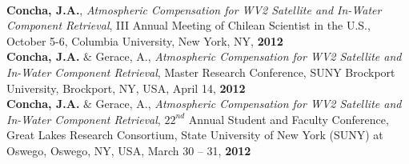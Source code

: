 \documentclass[11pt]{res}
\begin{document}
\begin{resume}
\vspace{0.1in}\\
{\bf Concha, J.A.}, {\it Atmospheric Compensation for WV2 Satellite and In-Water Component Retrieval}, III Annual Meeting of Chilean Scientist in the U.S., October 5-6, Columbia University, New York, NY, {\bf 2012}
\vspace{0.1in}\\
{\bf Concha, J.A.} $\&$ Gerace, A., {\it Atmospheric Compensation for WV2 Satellite and In-Water Component Retrieval}, Master Research Conference, SUNY Brockport University, Brockport, NY, USA, April 14, {\bf 2012}
\vspace{0.1in}\\
{\bf Concha, J.A.} $\&$ Gerace, A., {\it Atmospheric Compensation for WV2 Satellite and In-Water Component Retrieval}, $22^{nd}$ Annual Student and Faculty Conference, Great Lakes Research Consortium, State University of New York (SUNY) at Oswego, Oswego, NY, USA, March 30 -- 31, {\bf 2012}\\

\vspace{-0.2in}

\end{resume}
\end{document}
